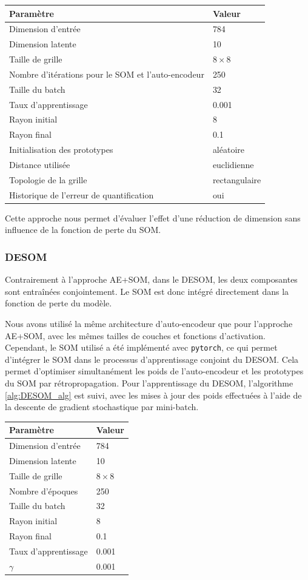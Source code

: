 \documentclass[12pt,a4paper]{report}
\begin{document}
\begin{center}
\begin{tabular}{ll}
\toprule
Paramètre & Valeur \\
\midrule
Dimension d'entrée & 784 \\
Dimension latente & 10 \\
Taille de grille & $8 \times 8$ \\
Nombre d'itérations pour le SOM et l'auto-encodeur & 250 \\
Taille du batch & 32 \\
Taux d'apprentissage & 0.001 \\
Rayon initial & 8 \\
Rayon final & 0.1 \\
Initialisation des prototypes & aléatoire \\
Distance utilisée & euclidienne \\
Topologie de la grille & rectangulaire \\
Historique de l'erreur de quantification & oui \\
\bottomrule
\end{tabular}
\end{center}

Cette approche nous permet d'évaluer l'effet d'une réduction de dimension sans influence de la fonction de perte du SOM.

\subsubsection{DESOM}
Contrairement à l'approche AE+SOM, dans le DESOM, les deux composantes sont entraînées conjointement. Le SOM est donc intégré directement dans la fonction de perte du modèle.

Nous avons utilisé la même architecture d'auto-encodeur que pour l'approche AE+SOM, avec les mêmes tailles de couches et fonctions d'activation.
Cependant, le SOM utilisé a été implémenté avec \texttt{pytorch}, ce qui permet d'intégrer le SOM dans le processus d'apprentissage conjoint du DESOM.
Cela permet d'optimiser simultanément les poids de l'auto-encodeur et les prototypes du SOM par rétropropagation. Pour l'apprentissage du DESOM,
l'algorithme \ref{alg:DESOM_alg} est suivi, avec les mises à jour des poids effectuées à l'aide de la descente de gradient stochastique par mini-batch.

\begin{center}
\begin{tabular}{ll} 
\toprule
Paramètre & Valeur \\
\midrule
Dimension d'entrée & 784 \\
Dimension latente & 10 \\
Taille de grille & $8 \times 8$ \\
Nombre d'époques & 250 \\
Taille du batch & 32 \\
Rayon initial & 8 \\
Rayon final & 0.1 \\
Taux d'apprentissage & 0.001 \\
$\gamma$ & 0.001 \\
\bottomrule
\end{tabular}
\end{center}
\end{document}
